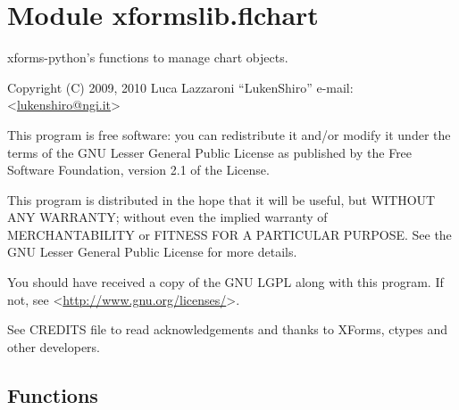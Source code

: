 %
%
%


\section{Module xformslib.flchart}

    \label{xformslib:flchart}

xforms-python's functions to manage chart objects.

Copyright (C) 2009, 2010  Luca Lazzaroni ``LukenShiro''
e-mail:  <\href{mailto:lukenshiro@ngi.it}{lukenshiro@ngi.it}>

This program is free software: you can redistribute it and/or modify
it under the terms of the GNU Lesser General Public License as
published by the Free Software Foundation, version 2.1 of the License.

This program is distributed in the hope that it will be useful,
but WITHOUT ANY WARRANTY; without even the implied warranty of
MERCHANTABILITY or FITNESS FOR A PARTICULAR PURPOSE. See the
GNU Lesser General Public License for more details.

You should have received a copy of the GNU LGPL along with this
program. If not, see <\href{http://www.gnu.org/licenses/}{http://www.gnu.org/licenses/}>.

See CREDITS file to read acknowledgements and thanks to XForms,
ctypes and other developers.


  \subsection{Functions}

    \label{xformslib:flchart:fl_add_chart}

